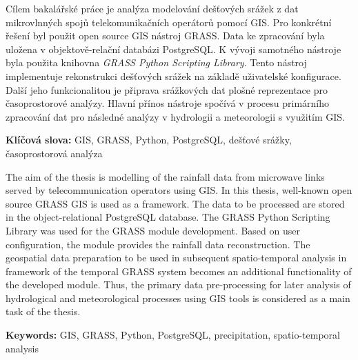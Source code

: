 \documentclass[a4paper,12pt,oneside]{report}
\author{Matěj Krejčí}
\newenvironment{abstractpage}
  {\cleardoublepage\vspace*{\fill}\thispagestyle{empty}}
  {\vfill\cleardoublepage}
\newenvironment{abstractx}[1]
  {\bigskip\selectlanguage{#1}%
   \begin{center}\bfseries\abstractname\end{center}}
  {\par\bigskip}
\newcommand{\klicslova}[2]{\noindent\textbf{#1: }#2}
\begin{document}
\pagestyle{empty}




\renewcommand{\bibname}{Literatura}
\renewcommand{\contentsname}{Obsah}
\renewcommand{\figurename}{Obr.}
\renewcommand{\tablename}{Tab.}




\renewcommand\footnotelayout{\footnotesize}



\newpage


\begin{abstractpage}
\begin{abstractx}{czech}

  Cílem bakalářské práce je analýza modelování dešťových srážek z dat
  mikrovlnných spojů telekomunikačních operátorů pomocí GIS. Pro
  konkrétní řešení byl použit open source GIS nástroj GRASS. Data ke
  zpracování byla uložena v objektově-relační databázi PostgreSQL. K
  vývoji samotného nástroje byla použita knihovna \textit{GRASS Python
    Scripting Library}. Tento nástroj implementuje rekonstrukci
  dešťových srážek na základě uživatelské konfigurace. Další jeho
  funkcionalitou je připrava srážkových dat plošné reprezentace pro
  časoprostorové analýzy. Hlavní přínos nástroje spočívá v procesu
  primárního zpracování dat pro následné analýzy v hydrologii a
  meteorologii s využitím GIS.


  \klicslova{Klíčová slova}{GIS, GRASS, Python, PostgreSQL,
    dešťové srážky, \newline časoprostorová analýza}
\end{abstractx}

\begin{abstractx}{english}

  The aim of the thesis is modelling of the rainfall data from
  microwave links served by telecommunication operators using GIS. In
  this thesis, well-known open source GRASS GIS is used as a
  framework. The data to be processed are stored in the
  object-relational PostgreSQL database. The GRASS Python Scripting
  Library was used for the GRASS module development. Based on user
  configuration, the module provides the rainfall data
  reconstruction. The geospatial data preparation to be used in
  subsequent spatio-temporal analysis in framework of the temporal
  GRASS system becomes an additional functionality of the developed
  module. Thus, the primary data pre-processing for later analysis of
  hydrological and meteorological processes using GIS tools is
  considered as a main task of the thesis.

  \klicslova{Keywords}{GIS, GRASS, Python, PostgreSQL,
    precipitation, spatio-temporal analysis}
\end{abstractx}
\end{abstractpage}
\end{document}
